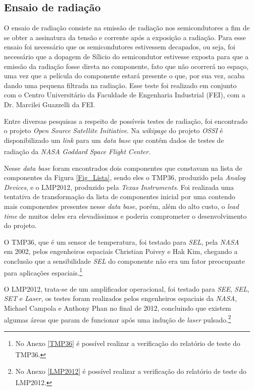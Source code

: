 \documentclass[
	12pt,				%
	openright,			%
	oneside,			%
	a4paper,			%
	english,			%
	french,				%
	spanish,			%
	brazil,				%
	oldfontcommands
	]{abntex2}
\begin{document}
\subsection[Ensaio de radiação]{Ensaio de radiação}	

	O ensaio de radiação consiste na emissão de radiação nos semicondutores a fim de se obter a assinatura da tensão e corrente após a exposição a radiação. Para esse ensaio foi necessário que os semicondutores estivessem decapados, ou seja, foi necessário que a dopagem de Sílicio do semicondutor estivesse exposta para que a emissão da radiação fosse direta no componente, fato que não ocorrerá no espaço, uma vez que a película do componente estará presente o que, por sua vez, acaba dando uma pequena filtrada na radiação. Esse teste foi realizado em conjunto com o Centro Universitário da Faculdade de Engenharia Industrial (FEI), com a Dr. Marcilei Guazzelli da FEI.
	
	Entre diversas pesquisas a respeito de possíveis testes de radiação, foi encontrado o projeto \textit{Open Source Satellite Initiative}. Na \textit{wikipage} do projeto \textit{OSSI} é disponibilizado um \textit{link} para um \textit{data base} que contém dados de testes de radiação da \textit{NASA Goddard Space Flight Center}.\textsuperscript{\cite{OSSI}}\textsuperscript{\cite{OSSI2}}\textsuperscript{\cite{OSSI3}}
	
	Nesse \textit{data base} foram encontrados dois componentes que constavam na lista de componentes da Figura \ref{Fig_Lista}, sendo eles o TMP36, produzido pela \textit{Analog Devices}, e o LMP2012, produzido pela \textit{Texas Instruments}. Foi realizada uma tentativa de transformação da lista de componentes inicial por uma contendo mais componentes presentes nesse \textit{data base}, porém, além do alto custo, o \textit{lead time} de muitos deles era elevadíssimos e poderia comprometer o desenvolvimento do projeto.
	
	O TMP36, que é um sensor de temperatura, foi testado para \textit{SEL}, pela \textit{NASA} em 2002, pelos engenheiros espaciais Christian Poivey e Hak Kim, chegando a conclusão que a sensibilidade \textit{SEL} do componente não era um fator preocupante para aplicações espaciais.\footnote{No Anexo \ref{TMP36} é possível realizar a verificação do relatório de teste do TMP36.\textsuperscript{\cite{TMP36}}}
	
	O LMP2012, trata-se de um amplificador operacional, foi testado para \textit{SEE}, \textit{SEL}, \textit{SET} e \textit{Laser}, os testes foram realizados pelos engenheiros espaciais da \textit{NASA}, Michael Campola e Anthony Phan no final de 2012, concluindo que existem algumas áreas que param de funcionar após uma indução de \textit{laser} pulsado.\footnote{No Anexo \ref{LMP2012} é possível realizar a verificação do relatório de teste do LMP2012.\textsuperscript{\cite{LMP2012}}}
	
\end{document}
